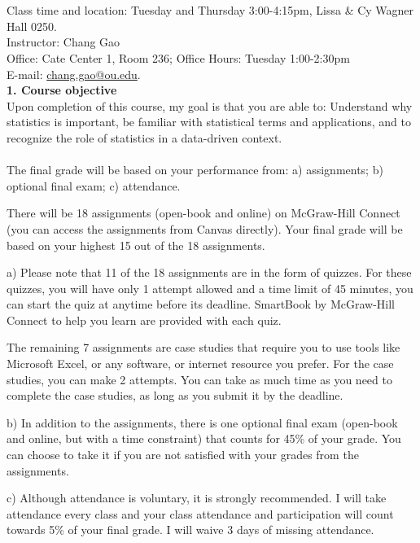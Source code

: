 \documentclass[12pt,letterpaper]{article}
\begin{document}
\bigskip\\
\medskip\\
\noindent Class time and location: Tuesday and Thursday 3:00-4:15pm, Lissa \& Cy Wagner Hall 0250.\medskip\\
\noindent Instructor: Chang Gao\medskip\\
\noindent Office: Cate Center 1, Room 236; Office Hours: Tuesday 1:00-2:30pm\\
\noindent E-mail: \href{mailto:chang.gao@ou.edu}{chang.gao@ou.edu}.\bigskip\\
{\bf 1. Course objective}\medskip\\
Upon completion of this course, my goal is that you are able to: Understand why statistics is important, be familiar with statistical terms and applications, and to recognize the role of statistics in a data-driven context.\bigskip\\
\medskip\\
The final grade will be based on your performance from: a) assignments; b) optional final exam; c) attendance.

There will be 18 assignments (open-book and online) on McGraw-Hill Connect (you can access the assignments from Canvas directly). Your final grade will be based on your highest 15 out of the 18 assignments.

a) Please note that 11 of the 18 assignments are in the form of quizzes. For these quizzes, you will have only 1 attempt allowed and a time limit of 45 minutes, you can start the quiz at anytime before its deadline. SmartBook by McGraw-Hill Connect to help you learn are provided with each quiz.

The remaining 7 assignments are case studies that require you to use tools like Microsoft Excel, or any software, or internet resource you prefer. For the case studies, you can make 2 attempts. You can take as much time as you need to complete the case studies, as long as you submit it by the deadline.

b) In addition to the assignments, there is one optional final exam (open-book and online, but with a time constraint) that counts for 45\% of your grade. You can choose to take it if you are not satisfied with your grades from the assignments.

c) Although attendance is voluntary, it is strongly recommended. I will take attendance every class and your class attendance and participation will count towards 5\% of your final grade. I will waive 3 days of missing attendance.
\end{document}
